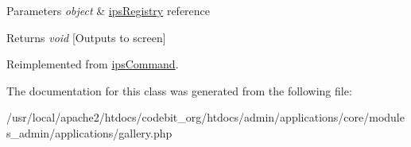 \begin{DoxyParams}{Parameters}
{\em object} & \hyperlink{classips_registry}{ips\-Registry} reference \\
\hline
\end{DoxyParams}
\begin{DoxyReturn}{Returns}
{\itshape void} \mbox{[}Outputs to screen\mbox{]} 
\end{DoxyReturn}


Reimplemented from \hyperlink{classips_command_afbc4e912a0604b94d47d66744c64d8ba}{ips\-Command}.



The documentation for this class was generated from the following file\-:\begin{DoxyCompactItemize}
\item 
/usr/local/apache2/htdocs/codebit\-\_\-org/htdocs/admin/applications/core/modules\-\_\-admin/applications/gallery.\-php\end{DoxyCompactItemize}
